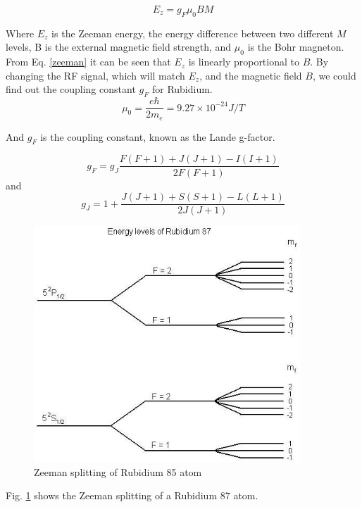 \documentclass[prb,preprint]{revtex4-1}
\begin{document}
\begin{equation}
E_{z}=g_{F} \mu_{0} BM
\label{zeeman}
\end{equation}

Where $E_{z}$ is the Zeeman energy, the energy difference between two different $M$ levels, B is the external magnetic field strength, and $\mu_{0}$ is the Bohr magneton. From Eq. \eqref{zeeman} it can be seen that $E_{z}$ is linearly proportional to $B$. By changing the RF signal, which will match $E_{z}$, and the magnetic field $B$, we could find out the coupling constant $g_{F}$ for Rubidium.\\

\begin{equation}
\mu_{0}=\frac{e\hbar}{2m_{e}}=9.27\times10^{-24} J/T
\label{mu0}
\end{equation}

And $g_{F}$ is the coupling constant, known as the Lande g-factor. 

\begin{equation}
g_{F}=g_{J} \frac{F(F+1)+J(J+1)-I(I+1)}{2F(F+1)}
\label{gf}
\end{equation}
and
\begin{equation}
g_{J}=1+\frac{J(J+1)+S(S+1)-L(L+1)}{2J(J+1)}
\label{gj}
\end{equation}

\begin{figure}[h]
\centering
\includegraphics[width=10cm]{energylevels.jpg}
\caption{Zeeman splitting of Rubidium 85 atom \cite{energy}}
\label{energylevels}
\end{figure}

Fig. \ref{energylevels} shows the Zeeman splitting of a Rubidium 87 atom. \\
\end{document}
